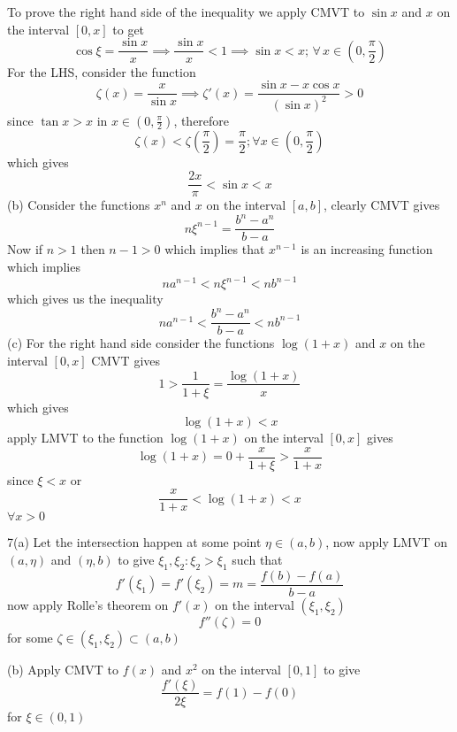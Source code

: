 \documentclass[12pt]{article}
\begin{document}
To prove the right hand side of the inequality we apply CMVT to $\sin x$ and $x$ on the interval $[0,x]$ to get
$$
\cos \xi = \frac{\sin x}{x} \implies \frac{\sin x}{x}<1 \implies \sin x < x;\, \forall\, x \in\left( 0, \frac{\pi}{2} \right)
$$
For the LHS, consider the function
$$
\zeta(x) = \frac{x}{\sin x} \implies \zeta'(x) = \frac{\sin x -x\cos x}{(\sin x)^{2}} > 0
$$
since $\tan x > x$ in $x \in\left( 0, \frac{\pi}{2} \right)$, therefore
$$
\zeta(x) < \zeta\left( \frac{\pi}{2} \right) = \frac{\pi}{2}; \forall x \in \left( 0, \frac{\pi}{2} \right)
$$
which gives
$$
\boxed{
\frac{2x}{\pi} < \sin x < x
}
$$
(b)
Consider the functions $x^n$ and $x$ on the interval $[a,b]$, clearly CMVT gives
$$
n\xi^{n-1} = \frac{b^{n}-a^{n}}{b-a}
$$Now if $n>1$ then $n-1>0$ which implies that $x^{n-1}$ is an increasing function which implies
$$
na^{n-1}< n\xi^{n-1} < nb^{n-1}
$$
which gives us the inequality
$$
\boxed{
na^{n-1} < \frac{b^{n} - a^{n}}{b-a} < nb^{n-1}
}
$$
(c)
For the right hand side consider the functions $\log(1+x)$ and $x$ on the interval $[0,x]$ CMVT gives
$$
1>\frac{1}{1+ \xi} =\frac{\log(1+x)}{x}
$$
which gives 
$$
\log(1+x)< x
$$
apply LMVT to the function $\log(1+x)$ on the interval $[0,x]$ gives
$$
\log(1+x) = 0 + \frac{x}{1 + \xi} > \frac{x}{1+x}
$$since $\xi < x$ or
$$
\boxed{
\frac{x}{1+x}<\log(1+x)<x
}
$$
$\forall x>0$

7(a)
Let the intersection happen at some point $\eta \in (a,b)$, now apply LMVT on $(a,\eta)$ and $(\eta, b)$ to give $\xi_{1}, \xi_{2}:\xi_{2}>\xi_{1}$ such that
$$
f'(\xi_{1})=f'(\xi_{2}) = m = \frac{f(b)-f(a)}{b-a}
$$
now apply Rolle's theorem on $f'(x)$ on the interval $(\xi_{1},\xi_{2})$
$$
f''(\zeta) = 0
$$
for some $\zeta \in (\xi_{1}, \xi_{2}) \subset (a,b)$

(b) Apply CMVT to $f(x)$ and $x^{2}$ on the interval $[0,1]$ to give
$$
\frac{f'(\xi)}{2\xi} = f(1)-f(0)
$$
for $\xi \in(0,1)$
\end{document}
